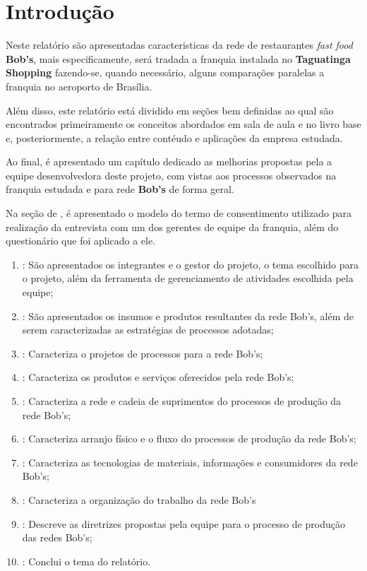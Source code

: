 \chapter[Introdução]{Introdução}
\label{chap:introducao}
	
	Neste relatório são apresentadas caracteristicas da rede de restaurantes \emph{fast food} \textbf{Bob's}, mais especificamente, será tradada a franquia instalada no \textbf{Taguatinga Shopping} fazendo-se, quando necessário, alguns comparações paralelas a franquia no aeroporto de Brasília.

	Além disso, este relatório está dividido em seções bem definidas ao qual são encontrados primeiramente os conceitos abordados em sala de aula e no livro base \cite{slack} e, posteriormente, a relação entre contéudo e aplicações da empresa estudada.

	Ao final, é apresentado um capítulo dedicado as melhorias propostas pela a equipe desenvolvedora deste projeto, com vistas aos processos observados na franquia estudada e para rede \textbf{Bob's} de forma geral.

	Na seção de , é apresentado o modelo do termo de consentimento utilizado para realização da entrevista com um dos gerentes de equipe da franquia, além do questionário que foi aplicado a ele.

	\begin{enumerate}
		\item{\textbf{}: São apresentados os integrantes e o gestor do projeto, o tema escolhido para o projeto, além da ferramenta de gerenciamento de atividades escolhida pela equipe;}
		\item{\textbf{}: São apresentados os insumos e produtos resultantes da rede Bob's, além de serem caracterizadas as estratégias de processos adotadas;}
		\item{\textbf{}: Caracteriza o projetos de processos para a rede Bob's;}
		\item{\textbf{}: Caracteriza os produtos e serviços oferecidos pela rede Bob's;}
		\item{\textbf{}: Caracteriza a rede e cadeia de suprimentos do processos de produção da rede Bob's;}
		\item{\textbf{}: Caracteriza arranjo físico e o fluxo do processos de produção da rede Bob's;}
		\item{\textbf{}: Caracteriza as tecnologias de materiais, informações e consumidores da rede Bob's;}
		\item{\textbf{}: Caracteriza a organização do trabalho da rede Bob's}
		\item{\textbf{}: Descreve as diretrizes propostas pela equipe para o processo de produção das redes Bob's;}
		\item{\textbf{}: Conclui o tema do relatório.}
	\end{enumerate}
